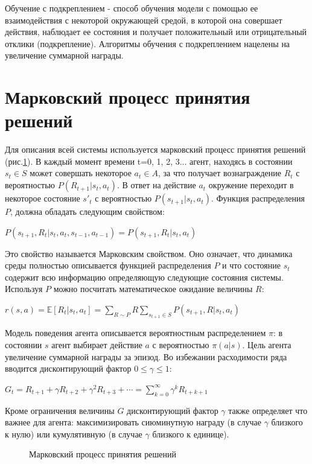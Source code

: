 \documentclass{mipt-thesis-bs}
\begin{document}
Обучение с подкреплением - способ обучения модели с помощью ее взаимодействия с некоторой окружающей средой, в которой она совершает действия, наблюдает ее состояния и получает положительный или отрицательный отклики (подкрепление). Алгоритмы обучения с подкреплением нацелены на увеличение суммарной награды.

\section{Марковский процесс принятия решений}
Для описания всей системы используется марковский процесс принятия решений (рис.\ref{mdp}). В каждый момент времени t=0, 1, 2, 3... агент, находясь в состоянии $s_t\in S$ может совершать некоторое $a_t\in A$, за что получает вознаграждение $R_t$ с вероятностью $P(R_{t+1}|s_t,a_t)$. В ответ на действие $a_t$ окружение переходит в некоторое состояние $s'_t$ с вероятностью $P(s_{t+1}|s_t,a_t)$. Функция распределения $P$, должна обладать следующим свойством:

$P(s_{t+1}, R_{t}|s_t,a_t,s_{t-1},a_{t-1}) = P(s_{t+1}, R_{t}|s_t,a_t)$

Это свойство называется Марковским свойством. Оно означает, что динамика среды полностью описывается функцией распределения $P$ и что состояние $s_t$ содержит всю информацию определяющую следующие состояния системы. Используя $P$ можно посчитать математическое ожидание величины $R$:

$r(s, a) = \mathbb{E}[R_{t} | s_t, a_t]=\sum_{R \sim P} R \sum_{s_{t+1} \in S} P(s_{t+1}, R | s_t, a_t)$

Модель поведения агента описывается вероятностным распределением $\pi$: в состоянии $s$ агент выбирает действие $a$ с вероятностью $\pi(a|s)$. Цель агента увеличение суммарной награды за эпизод. Во избежании расходимости ряда вводится дисконтирующий фактор $0 \leq\gamma\leq 1$:

$G_{t} = R_{t+1}+\gamma R_{t+2}+\gamma^{2} R_{t+3}+\cdots=\sum_{k=0}^{\infty} \gamma^{k} R_{t+k+1}$

Кроме ограничения величины $G$ дисконтирующий фактор $\gamma$ также определяет что важнее для агента: максимизировать сиюминутную награду (в случае $\gamma$ близкого к нулю) или кумулятивную (в случае $\gamma$ близкого к единице).

\begin{figure}[ht]
    \centering
    \vspace{-0.2cm}
    \caption{Марковский процесс принятия решений}
    \label{mdp}
\end{figure}
\end{document}
